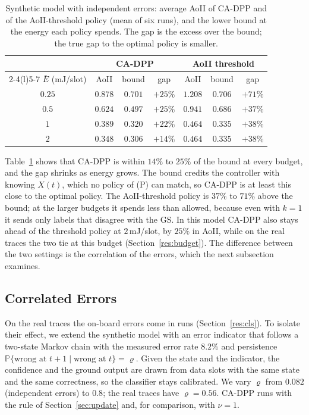\documentclass[5p,twocolumn]{elsarticle}
\theoremstyle{remark}
\newcommand{\Prob}{\mathbb{P}}
\begin{document}
\begin{table}[t]
\caption{Synthetic model with independent errors: average AoII of CA-DPP and of the AoII-threshold policy (mean of six runs), and the lower bound at the energy each policy spends. The gap is the excess over the bound; the true gap to the optimal policy is smaller.}\label{tab:optgap}
\centering\footnotesize
\begin{tabular}{@{}ccccccc@{}}
\toprule
 & \multicolumn{3}{c}{CA-DPP} & \multicolumn{3}{c}{AoII threshold}\\
\cmidrule(lr){2-4}\cmidrule(l){5-7}
$\bar E$ (mJ/slot) & AoII & bound & gap & AoII & bound & gap\\
\midrule
$0.25$ & $0.878$ & $0.701$ & $+25\%$ & $1.208$ & $0.706$ & $+71\%$\\
$0.5$ & $0.624$ & $0.497$ & $+25\%$ & $0.941$ & $0.686$ & $+37\%$\\
$1$ & $0.389$ & $0.320$ & $+22\%$ & $0.464$ & $0.335$ & $+38\%$\\
$2$ & $0.348$ & $0.306$ & $+14\%$ & $0.464$ & $0.335$ & $+38\%$\\
\bottomrule
\end{tabular}
\end{table}

Table~\ref{tab:optgap} shows that CA-DPP is within $14\%$ to $25\%$ of the bound at every budget, and the gap shrinks as energy grows. The bound credits the controller with knowing $X(t)$, which no policy of (P) can match, so CA-DPP is at least this close to the optimal policy. The AoII-threshold policy is $37\%$ to $71\%$ above the bound; at the larger budgets it spends less than allowed, because even with $k=1$ it sends only labels that disagree with the GS. In this model CA-DPP also stays ahead of the threshold policy at $2$\,mJ/slot, by $25\%$ in AoII, while on the real traces the two tie at this budget (Section~\ref{res:budget}). The difference between the two settings is the correlation of the errors, which the next subsection examines.

\subsection{Correlated Errors}\label{res:corr}
On the real traces the on-board errors come in runs (Section~\ref{res:cls}). To isolate their effect, we extend the synthetic model with an error indicator that follows a two-state Markov chain with the measured error rate $8.2\%$ and persistence $\Prob\{\text{wrong at }t+1\mid\text{wrong at }t\}=\varrho$. Given the state and the indicator, the confidence and the ground output are drawn from data slots with the same state and the same correctness, so the classifier stays calibrated. We vary $\varrho$ from $0.082$ (independent errors) to $0.8$; the real traces have $\varrho=0.56$. CA-DPP runs with the rule of Section~\ref{sec:update} and, for comparison, with $\nu=1$.
\end{document}
